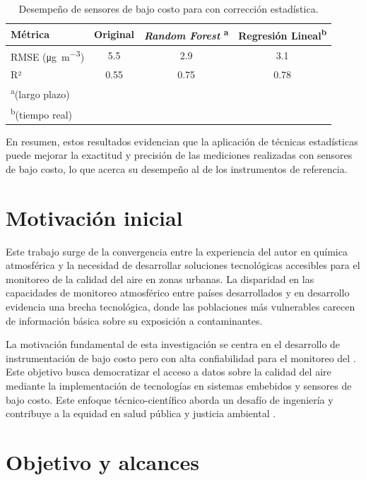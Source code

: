 \begin{table}[h!]
	\centering
	\small
	\caption{Desempeño de sensores de bajo costo para \MPF con corrección estadística.}
	\begin{tabular}{lccc}
		\toprule
		\textbf{Métrica} & \textbf{Original} & \textbf{\textit{Random Forest} \textsuperscript{a}} & \textbf{Regresión Lineal\textsuperscript{b}} \\
		\midrule
		RMSE (\si{\micro\gram\per\cubic\meter}) & \num{5,5} & \num{2,9} & \num{3,1} \\
		R² & \num{0,55} & \num{0,75} & \num{0,78} \\
		\bottomrule
		\multicolumn{4}{l}{\footnotesize\textsuperscript{a}(largo plazo)} \\
		\multicolumn{4}{l}{\footnotesize\textsuperscript{b}(tiempo real)}
	\end{tabular}
	\label{table:improvement_sensors}
\end{table}

En resumen, estos resultados evidencian que la aplicación de técnicas estadísticas puede mejorar la exactitud y precisión de las mediciones realizadas con sensores de bajo costo, lo que acerca su desempeño al de los instrumentos de referencia.



\section{Motivación inicial}
Este trabajo surge de la convergencia entre la experiencia del autor en química atmosférica y la necesidad de desarrollar soluciones tecnológicas accesibles para el monitoreo de la calidad del aire en zonas urbanas. La disparidad en las capacidades de monitoreo atmosférico entre países desarrollados y en desarrollo evidencia una brecha tecnológica, donde las poblaciones más vulnerables carecen de información básica sobre su exposición a contaminantes.

La motivación fundamental de esta investigación se centra en el desarrollo de instrumentación de bajo costo pero con alta confiabilidad para el monitoreo del \MPF. Este objetivo busca democratizar el acceso a datos sobre la calidad del aire mediante la implementación de tecnologías en sistemas embebidos y sensores de bajo costo. Este enfoque técnico-científico aborda un desafío de ingeniería y contribuye a la equidad en salud pública y justicia ambiental \cite{HerveEspejo2010}.

\section{Objetivo y alcances}

